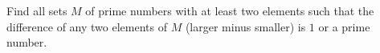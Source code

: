 Find all sets $M$ of prime numbers with at least two elements such that the difference of any two elements of $M$ (larger minus smaller) is $1$ or a prime number.
